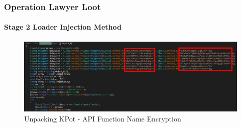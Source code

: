 \documentclass[aspectratio=169]{beamer}
\begin{document}
{
\begin{frame}
  \frametitle{Operation Lawyer Loot}
  \framesubtitle{Stage 2 Loader Injection Method}
  \begin{center}
    \begin{figure}
      \includegraphics[scale=1.28]{kpot-unpacking-8}
      \caption{Unpacking KPot - API Function Name Encryption}
    \end{figure}
  \end{center}
\end{frame}
}
\end{document}
